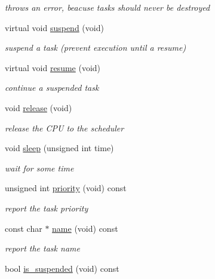 \begin{DoxyCompactItemize}
\begin{DoxyCompactList}\small\item\em throws an error, beacuse tasks should never be destroyed \end{DoxyCompactList}\item 
virtual void \hyperlink{classrtos_1_1task__base_a2e5c57f7993ffa43c91348277ec2478c}{suspend} (void)
\begin{DoxyCompactList}\small\item\em suspend a task (prevent execution until a resume) \end{DoxyCompactList}\item 
virtual void \hyperlink{classrtos_1_1task__base_a4e9601dcea7c1d392b05ebd4f921de04}{resume} (void)
\begin{DoxyCompactList}\small\item\em continue a suspended task \end{DoxyCompactList}\item 
void \hyperlink{classrtos_1_1task__base_a0b397b5bbdbfdeea5be6c6b505b5e266}{release} (void)
\begin{DoxyCompactList}\small\item\em release the C\+PU to the scheduler \end{DoxyCompactList}\item 
void \hyperlink{classrtos_1_1task__base_a1110fdfe776e7f256eb809216e97c836}{sleep} (unsigned int time)
\begin{DoxyCompactList}\small\item\em wait for some time \end{DoxyCompactList}\item 
unsigned int \hyperlink{classrtos_1_1task__base_aca1f728cef4c3e70e1ce08b6e313b586}{priority} (void) const \hypertarget{classrtos_1_1task__base_aca1f728cef4c3e70e1ce08b6e313b586}{}\label{classrtos_1_1task__base_aca1f728cef4c3e70e1ce08b6e313b586}

\begin{DoxyCompactList}\small\item\em report the task priority \end{DoxyCompactList}\item 
const char $\ast$ \hyperlink{classrtos_1_1task__base_ad6469d5653e3021769e4fa89c20920bf}{name} (void) const \hypertarget{classrtos_1_1task__base_ad6469d5653e3021769e4fa89c20920bf}{}\label{classrtos_1_1task__base_ad6469d5653e3021769e4fa89c20920bf}

\begin{DoxyCompactList}\small\item\em report the task name \end{DoxyCompactList}\item 
bool \hyperlink{classrtos_1_1task__base_ae62a76e0a7fd1548077eb26481b52dee}{is\+\_\+suspended} (void) const \hypertarget{classrtos_1_1task__base_ae62a76e0a7fd1548077eb26481b52dee}{}\label{classrtos_1_1task__base_ae62a76e0a7fd1548077eb26481b52dee}


\end{DoxyCompactItemize}
